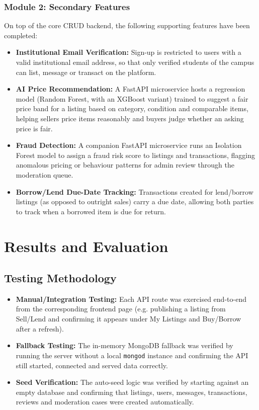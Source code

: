 \documentclass[12pt]{report}
\begin{document}
\subsection{Module 2: Secondary Features}
On top of the core CRUD backend, the following supporting features have been completed:
\begin{itemize}
    \item \textbf{Institutional Email Verification:} Sign-up is restricted to users with a
    valid institutional email address, so that only verified students of the campus can list,
    message or transact on the platform.
    \item \textbf{AI Price Recommendation:} A FastAPI microservice hosts a regression model
    (Random Forest, with an XGBoost variant) trained to suggest a fair price band for a
    listing based on category, condition and comparable items, helping sellers price items
    reasonably and buyers judge whether an asking price is fair.
    \item \textbf{Fraud Detection:} A companion FastAPI microservice runs an Isolation Forest
    model to assign a fraud risk score to listings and transactions, flagging anomalous
    pricing or behaviour patterns for admin review through the moderation queue.
    \item \textbf{Borrow/Lend Due-Date Tracking:} Transactions created for lend/borrow
    listings (as opposed to outright sales) carry a due date, allowing both parties to track
    when a borrowed item is due for return.
\end{itemize}

\chapter{Results and Evaluation}

\section{Testing Methodology}
\begin{itemize}
    \item \textbf{Manual/Integration Testing:} Each API route was exercised end-to-end from
    the corresponding frontend page (e.g. publishing a listing from Sell/Lend and confirming
    it appears under My Listings and Buy/Borrow after a refresh).
    \item \textbf{Fallback Testing:} The in-memory MongoDB fallback was verified by running
    the server without a local \texttt{mongod} instance and confirming the API still started,
    connected and served data correctly.
    \item \textbf{Seed Verification:} The auto-seed logic was verified by starting against an
    empty database and confirming that listings, users, messages, transactions, reviews and
    moderation cases were created automatically.
\end{itemize}
\end{document}
